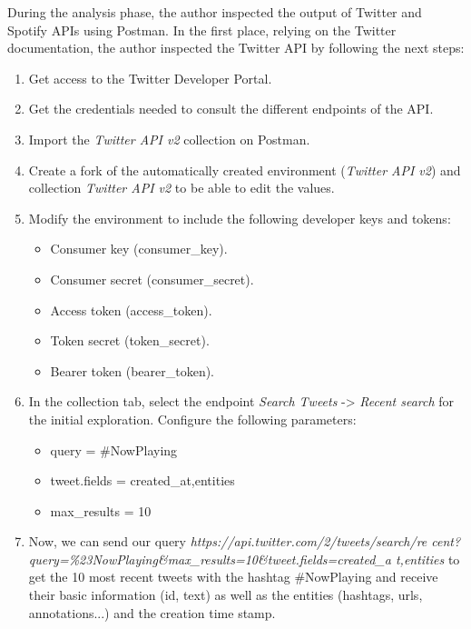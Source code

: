 \nonzeroparskip During the analysis phase, the author inspected the output of Twitter and Spotify APIs using Postman. In the first place, relying on the Twitter documentation, the author inspected the Twitter API by following the next steps:
\begin{enumerate}
	\item Get access to the Twitter Developer Portal.
	\item Get the credentials needed to consult the different endpoints of the API.
	\item Import the \textit{Twitter API v2} collection on Postman.
	\item Create a fork of the automatically created environment (\textit{Twitter API v2}) and collection \textit{Twitter API v2} to be able to edit the values.
	\item Modify the environment to include the following developer keys and tokens:
	\begin{itemize}
		\item Consumer key (consumer\_key).
		\item Consumer secret (consumer\_secret).
		\item Access token (access\_token).
		\item Token secret (token\_secret).
		\item Bearer token (bearer\_token).
	\end{itemize}
	\item In the collection tab, select the endpoint \textit{Search Tweets} -> \textit{Recent search} for the initial exploration. Configure the following parameters:
	\begin{itemize}
		\item query = \#NowPlaying
		\item tweet.fields = created\_at,entities
		\item max\_results = 10
	\end{itemize}
	\item Now, we can send our query \textit{https://api.twitter.com/2/tweets/search/re cent?query=\%23NowPlaying\&max\_results=10\&tweet.fields=created\_a t,entities} to get the 10 most recent tweets with the hashtag \#NowPlaying and receive their basic information (id, text) as well as the entities (hashtags, urls, annotations...) and the creation time stamp.
\end{enumerate}

